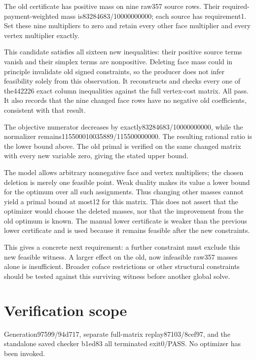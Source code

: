 \documentclass[
  10pt,
]{report}
\begin{document}
The old certificate has positive mass on nine raw357 source rows. Their
required-payment-weighted mass is83284683/10000000000; each source has
requirement1. Set these nine multipliers to zero and retain every other
face multiplier and every vertex multiplier exactly.

This candidate satisfies all sixteen new inequalities: their positive
source terms vanish and their simplex terms are nonpositive. Deleting
face mass could in principle invalidate old signed constraints, so the
producer does not infer feasibility solely from this observation. It
reconstructs and checks every one of the442226 exact column inequalities
against the full vertex-cost matrix. All pass. It also records that the
nine changed face rows have no negative old coefficients, consistent
with that result.

The objective numerator decreases by exactly83284683/10000000000, while
the normalizer remains115500010035889/115500000000. The resulting
rational ratio is the lower bound above. The old primal is verified on
the same changed matrix with every new variable zero, giving the stated
upper bound.

The model allows arbitrary nonnegative face and vertex multipliers; the
chosen deletion is merely one feasible point. Weak duality makes its
value a lower bound for the optimum over all such assignments. Thus
changing other masses cannot yield a primal bound at most12 for this
matrix. This does not assert that the optimizer would choose the deleted
masses, nor that the improvement from the old optimum is known. The
manual lower certificate is weaker than the previous lower certificate
and is used because it remains feasible after the new constraints.

This gives a concrete next requirement: a further constraint must
exclude this new feasible witness. A larger effect on the old, now
infeasible raw357 masses alone is insufficient. Broader coface
restrictions or other structural constraints should be tested against
this surviving witness before another global solve.

\section{Verification scope}\label{verification-scope-1}

Generation97599/94d717, separate full-matrix replay87103/8cef97, and the
standalone saved checker b1ed83 all terminated exit0/PASS. No optimizer
has been invoked.
\end{document}
